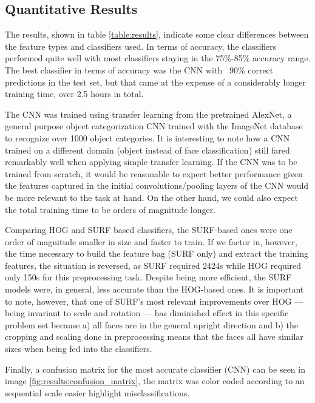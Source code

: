 \documentclass[11pt]{article}
\begin{document}
    \subsection{Quantitative Results}
        The results, shown in table \ref{table:results}, indicate some clear differences between the feature types and classifiers used. In terms of accuracy, the classifiers performed quite well with most classifiers staying in the 75\%-85\% accuracy range. The best classifier in terms of accuracy was the CNN with ~90\% correct predictions in the test set, but that came at the expense of a considerably longer training time, over 2.5 hours in total.

        The CNN was trained using transfer learning from the pretrained AlexNet, a general purpose object categorization CNN trained with the ImageNet database to recognize over 1000 object categories. It is interesting to note how a CNN trained on a different domain (object instead of face classification) still fared remarkably well when applying simple transfer learning. If the CNN was to be trained from scratch, it would be reasonable to expect better performance given the features captured in the initial convolutions/pooling layers of the CNN would be more relevant to the task at hand. On the other hand, we could also expect the total training time to be orders of magnitude longer.

        Comparing HOG and SURF based classifiers, the SURF-based ones were one order of magnitude smaller in size and faster to train. If we factor in, however, the time necessary to build the feature bag (SURF only) and extract the training features, the situation is reversed, as SURF required 2424s while HOG required only 150s for this preprocessing task. Despite being more efficient, the SURF models were, in general, less accurate than the HOG-based ones. It is important to note, however, that one of SURF's most relevant improvements over HOG --- being invariant to scale and rotation --- has diminished effect in this specific problem set because a) all faces are in the general upright direction and b) the cropping and scaling done in preprocessing means that the faces all have similar sizes when being fed into the classifiers.

        Finally, a confusion matrix for the most accurate classifier (CNN) can be seen in image \ref{fig:results:confusion_matrix}, the matrix was color coded according to an sequential scale easier highlight misclassifications.
\end{document}

